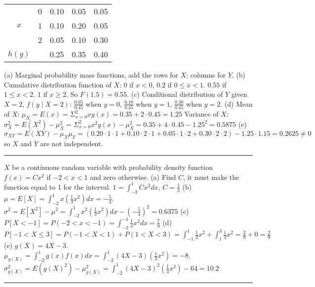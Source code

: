\documentclass[9pt]{article}
\begin{document}
\begin{multicols*}{2}
\begin{wraptable}{l}{3.7cm}
\begin{tabular}{c | c | c c c}
            \hline
            & 0 & 0.10 & 0.05 & 0.05\\
            $x$ & 1 & 0.10 & 0.20 & 0.05\\
            & 2 & 0.05 & 0.10 & 0.30\\
            $h(y)$ & & 0.25 & 0.35 & 0.40
        \end{tabular}
    \end{wraptable}
    (a) Marginal probability mass functions, add the rows for $X$; columns for $Y$.\newline
    (b) Cumulative distribution function of $X$: $0$ if $x < 0$, $0.2$ if $0\leq x < 1$.
    $0.55$ if $1\leq x < 2$. $1$ if $x \geq 2$. So $F(1.5) = 0.55$.\newline
    (c) Conditional distribution of $Y$ given $X=2$, $f(y\mid X=2)$: $\frac{0.05}{0.45}$ 
    when $y=0$, $\frac{0.10}{0.45}$ when $y=1$, $\frac{0.30}{0.45}$ when $y=2$.\newline
    (d) Mean of $X$: $\mu_X=E(x) = \Sigma_{x=0}^{2}xg(x) = 0.35 + 2\cdot 0.45 = 1.25$
    Variance of $X$: $\sigma^{2}_{X}=E(X^2)-\mu_{X}^{2} = \Sigma_{x=0}^{2}x^2g(x)-\mu_{X}^{2}
    = 0.35 + 4 \cdot 0.45 - 1.25^2 = 0.5875$\newline
    (e) $\sigma_{XY}=E(XY)-\mu_X\mu_Y = (0.20\cdot 1\cdot 1 + 0.10 \cdot 2\cdot 1 + 0.05 
    \cdot 1 \cdot 2 + 0.30 \cdot 2 \cdot 2) - 1.25\cdot 1.15 = 0.2625 \not=0$ so $X$ and $Y$ are
    not independent.
    \rule{0.5\textwidth}{0.4pt}
    \noindent $X$ be a continuous random variable with probability density function $f(x)=Cx^2$ if 
    $-2<x<1$ and zero otherwise.\newline
    (a) Find $C$, it must make the function equal to 1 for the interval. 
    $1=\int_{-2}^{1}Cx^2dx$, $C = \frac{1}{3}$\newline
    (b) $\mu = E[X] = \int_{-2}^{1}x(\frac{1}{3}x^2)dx = -\frac{5}{4}$. $\sigma^2 = E[X^2]-\mu^2 = 
    \int_{-2}^{1}x^2(\frac{1}{3}x^2)dx - (-\frac{5}{4})^2 = 0.6375$\newline
    (c) $P[X < -1] = P(-2 < x < -1) = \int_{-2}^{-1}\frac{1}{3}x^2dx = \frac{7}{9}$\newline
    (d) $P[-1 < X \leq 3] = P(-1 < X < 1) + P(1 < X < 3) = 
    \int_{-1}^{1}\frac{1}{3}x^2 + \int_{1}^{3}\frac{1}{3}x^2 = \frac{2}{9} + 0 = \frac{2}{9}$\newline
    (e) $g(X) = 4X-3$. $\mu_{g(X)} = \int_{-2}^{1}g(x)f(x)dx = \int_{-2}^{1}(4X-3)(\frac{1}{3}x^2) = -8$. $ 
    \sigma_{g(X)}^{2}=E(g(X)^2)-\mu_{g(X)}^2 = \int_{-2}^{1}(4X-3)^2(\frac{1}{3}x^2)-64 = 10.2$
    \rule{0.5\textwidth}{0.4pt}
\end{multicols*}
\end{document}
